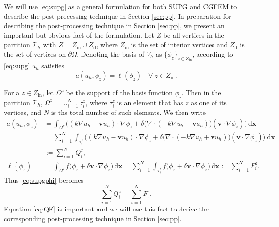 \documentclass[times]{nlaauth}
\numberwithin{equation}{section}
\begin{document}
We will use \eqref{eq:supg} as a general formulation for both SUPG and CGFEM to describe the post-processing technique in Section \ref{sec:pp}. In preparation for describing the post-processing technique in Section \ref{sec:pp}, we present an important but obvious fact of the formulation. Let $Z$ be all vertices in the partition $\mathcal{T}_h$ with $Z = Z_{\text{in}} \cup Z_\text{d}$, where $Z_{\text{in}}$ is the set of interior vertices and $Z_\text{d}$ is the set of vertices on $\partial\Omega$. Denoting the basis of $V_h$ as $\{ \phi_z \}_{z \in Z_\text{in}}$, according to
\eqref{eq:supg} $u_h$ satisfies
\begin{equation} \label{eq:supgphi}
a(u_h, \phi_z) = \ell (\phi_z) \quad \forall \ z \in Z_{\text{in}}.
\end{equation}

\noindent
For a $z \in Z_{\text{in}}$, let $\Omega^z$ be the support of the basis function $\phi_z$. Then in the partition $\mathcal{T}_h$, $\Omega^z = \cup_{i=1}^N \tau_i^z$, where
$\tau_i^z$ is an element that has $z$ as one of its vertices, and
 $N$ is the total number of such elements. We then write
\begin{equation} \label{eq:Q}
\begin{aligned}
a(u_h, \phi_z) & = \int_{\Omega^z} \Big(
( k\nabla u_h - \boldsymbol{v} u_h )  \cdot \nabla \phi_z + \delta  \big(  \nabla \cdot ( -k\nabla u_h + \boldsymbol{v} u_h ) \big)  ( \boldsymbol{v}  \cdot \nabla \phi_z)
\Big) \ \text{d} \boldsymbol{x} \\
& = \sum_{i=1}^N \int_{\tau_i^z}   \Big( ( k\nabla u_h - \boldsymbol{v} u_h )  \cdot \nabla \phi_z + \delta  \big(  \nabla \cdot ( -k\nabla u_h + \boldsymbol{v} u_h ) \big)  ( \boldsymbol{v}  \cdot \nabla \phi_z)  \Big) \ \text{d} \boldsymbol{x} \\
& := \sum_{i=1}^N Q_i^z, \\
\ell(\phi_z) & = \int_{\Omega^z} f\big( \phi_z + \delta \boldsymbol{v}  \cdot \nabla \phi_z \big) \ \text{d} \boldsymbol{x} = \sum_{i=1}^N  \int_{\tau_i^z} f \big( \phi_z + \delta \boldsymbol{v}  \cdot \nabla \phi_z \big) \ \text{d} \boldsymbol{x}  := \sum_{i=1}^N F_i^z.
\end{aligned}
\end{equation}
Thus \eqref{eq:supgphi} becomes
\begin{equation} \label{eq:QF}
\sum_{i=1}^N Q_i^z = \sum_{i=1}^N F_i^z.
\end{equation}
Equation \eqref{eq:QF} is important and we will use this fact to derive the corresponding post-processing technique in Section \ref{sec:pp}.
\end{document}
